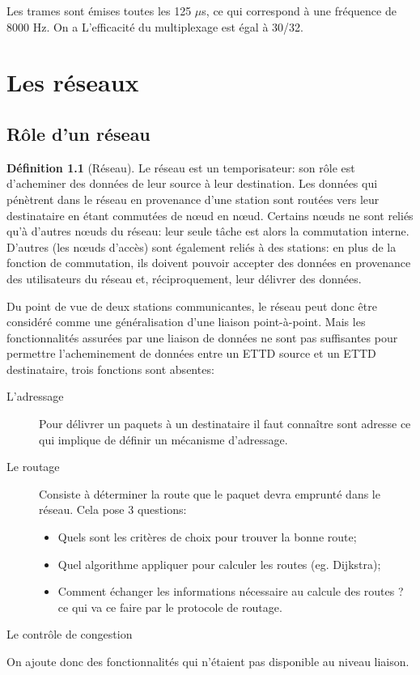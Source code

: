 \documentclass[11pt,english,french]{scrreprt}
\theoremstyle{remark}
\theoremstyle{definition}
\newtheorem*{def*}{Définition}
\begin{document}
Les trames sont émises toutes les 125 $\mu$s, ce qui correspond à une fréquence de 8000 Hz.
On a  L'efficacité du multiplexage est égal à 30/32.


\chapter{Les réseaux} %

\section{Rôle d'un réseau} %

\begin{def*}[Réseau]
	Le réseau est un temporisateur: son rôle est d'acheminer des données de leur source à leur destination. Les données qui pénètrent dans le réseau en provenance d'une station sont routées vers leur destinataire en étant commutées de nœud en nœud. Certains nœuds ne sont reliés qu'à d'autres nœuds du réseau: leur seule tâche est alors la commutation interne.
	D'autres (les nœuds d'accès) sont également reliés à des stations: en plus de la fonction de commutation, ils doivent pouvoir accepter des données en provenance des utilisateurs du réseau et, réciproquement, leur délivrer des données.	
\end{def*}

Du point de vue de deux stations communicantes, le réseau peut donc être considéré comme une généralisation d'une liaison point-à-point. Mais les fonctionnalités assurées par une liaison de données ne sont pas suffisantes pour permettre l'acheminement de données entre un ETTD source et un ETTD destinataire, trois fonctions sont absentes:
\begin{description} 
\item [L'adressage] Pour délivrer un paquets à un destinataire il faut connaître sont adresse ce qui implique de définir un mécanisme d'adressage.
\item [Le routage] Consiste à déterminer la route que le paquet devra emprunté dans le réseau. Cela pose 3 questions:\begin{itemize}
	\item Quels sont les critères de choix pour trouver la bonne route;
	\item Quel algorithme appliquer pour calculer les routes (eg. Dijkstra);
	\item Comment échanger les informations nécessaire au calcule des routes ? ce qui va ce faire par le protocole de routage.
	\end{itemize}
\item [Le contrôle de congestion]
\end{description}
On ajoute donc des fonctionnalités qui n'étaient pas disponible au niveau liaison.
\end{document}
